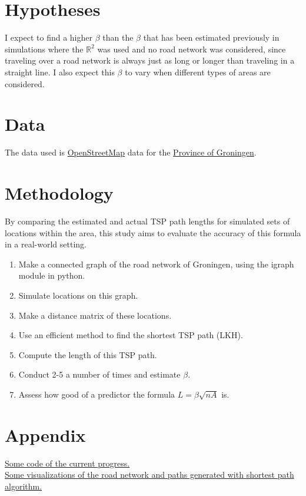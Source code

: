 \documentclass[a4paper,11pt]{article}
\newcommand{\1}[1]{\,I_{#1}} %
\begin{document}
\section{Hypotheses}
I expect to find a higher $\beta$ than the $\beta$ that has been
estimated previously in simulations where the $\mathbb{R}^2$ was used
and no road network was considered, since traveling over a road
network is always just as long or longer than traveling in a straight
line. I also expect this $\beta$ to vary when different types of
areas are considered.
\section{Data}
The data used is
\href{https://www.openstreetmap.org/#map=12/53.2184/6.5702}{OpenStreetMap}
data for the
\href{https://download.geofabrik.de/europe/netherlands/groningen.html}{Province
	of Groningen}.
\section{Methodology}
By comparing the estimated and actual TSP path lengths for simulated
sets of locations within the area, this study aims to evaluate the
accuracy of this formula in a real-world setting.
\begin{enumerate}
	\item Make a connected graph of the road network of Groningen,
	      using the igraph module in python.
	\item Simulate locations on this graph.
	\item Make a distance matrix of these locations.
	\item Use an efficient method to find the shortest TSP path (LKH).
	\item Compute the length of this TSP path.
	\item Conduct 2-5 a number of times and estimate $\beta$.
	\item Assess how good of a predictor the formula $L=\beta\sqrt{nA}$ is.
\end{enumerate}


\section{Appendix}
\href{https://github.com/koen1859/Scriptie}{Some code of the current
	progress.}\\
\href{https://koenstevens.nl/?page_id=182}{Some visualizations of the
	road network and paths generated with shortest path algorithm.}
\end{document}
